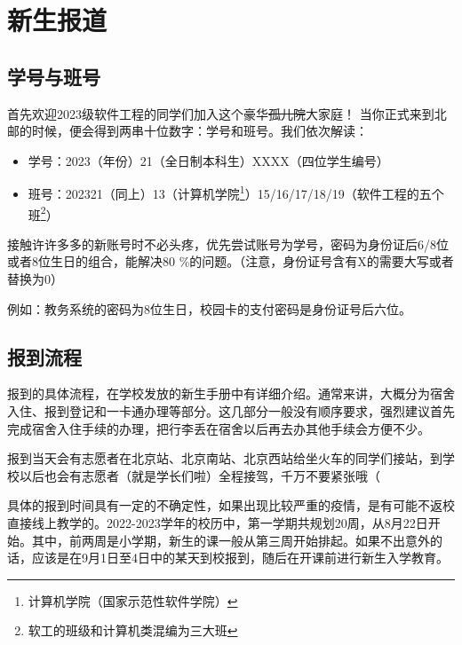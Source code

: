 \section{新生报道}

\subsection{学号与班号}

首先欢迎2023级软件工程的同学们加入这个豪华\sout{孤儿院}大家庭！
当你正式来到北邮的时候，便会得到两串十位数字：学号和班号。我们依次解读：
\begin{itemize}
    \itshape
    \item 学号：2023（年份）21（全日制本科生）XXXX（四位学生编号）
    \item 班号：202321（同上）13（计算机学院\footnote{计算机学院（国家示范性软件学院）}）15/16/17/18/19（软件工程的五个班\footnote{软工的班级和计算机类混编为三大班}）
\end{itemize}

接触许许多多的新账号时不必头疼，优先尝试账号为学号，密码为身份证后6/8位或者8位生日的组合，能解决80 \%的问题。（注意，身份证号含有X的需要大写或者替换为0）

例如：教务系统的密码为8位生日，校园卡的支付密码是身份证号后六位。

\subsection{报到流程}

报到的具体流程，在学校发放的新生手册中有详细介绍。通常来讲，大概分为宿舍入住、报到登记和一卡通办理等部分。这几部分一般没有顺序要求，强烈建议首先完成宿舍入住手续的办理，把行李丢在宿舍以后再去办其他手续会方便不少。

报到当天会有志愿者在北京站、北京南站、北京西站给坐火车的同学们接站，到学校以后也会有志愿者（就是学长们啦）全程接驾，千万不要紧张哦（


具体的报到时间具有一定的不确定性，如果出现比较严重的疫情，是有可能不返校直接线上教学的。2022-2023学年的校历中，第一学期共规划20周，从8月22日开始。其中，前两周是小学期，新生的课一般从第三周开始排起。如果不出意外的话，应该是在9月1日至4日中的某天到校报到，随后在开课前进行新生入学教育。
